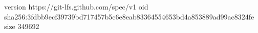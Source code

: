 version https://git-lfs.github.com/spec/v1
oid sha256:3fdbb9ecf39739bd717457b5c6e8eab83364554653bd4a853889ad99ac8324fe
size 349692
